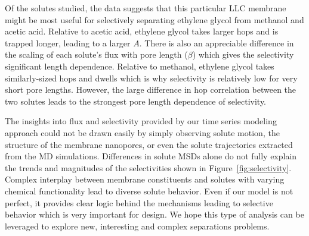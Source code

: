 \documentclass[aps,pre,preprint,groupedaddress,longbibliography]{revtex4-2}
\begin{document}


  Of the solutes studied, the data suggests that this particular LLC membrane 
  might be most useful for selectively separating ethylene glycol from methanol
  and acetic acid. Relative to acetic acid, ethylene glycol takes larger hops 
  and is trapped longer, leading to a larger $A$. There is also an appreciable 
  difference in the scaling of each solute's flux with pore length ($\beta$) 
  which gives the selectivity significant length dependence. Relative to methanol,
  ethylene glycol takes similarly-sized hops and dwells which is why selectivity
  is relatively low for very short pore lengths. However, the large difference in
  hop correlation between the two solutes leads to the strongest pore length 
  dependence of selectivity. 
  
  The insights into flux and selectivity provided by our time series modeling approach
  could not be drawn easily by simply observing solute motion, the structure of the 
  membrane nanopores, or even the solute trajectories extracted from the MD
  simulations. Differences in solute MSDs alone do not fully explain the trends and 
  magnitudes of the selectivities shown in Figure~\ref{fig:selectivity}.
  Complex interplay between membrane constituents and solutes with varying
  chemical functionality lead to diverse solute behavior. Even if our model is 
  not perfect, it provides clear logic behind the mechanisms leading to selective
  behavior which is very important for design. We hope this type of analysis can
  be leveraged to explore new, interesting and complex separations problems.
  
  
\end{document}
